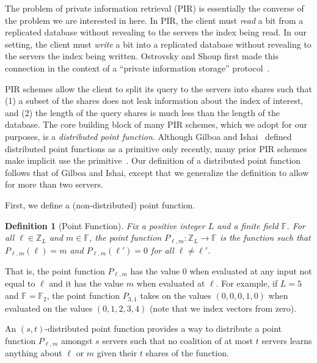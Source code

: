 \documentclass[10pt,twocolumn]{article}
\newtheorem{defn}{Definition}
\newcommand{\Z}{\mathbb{Z}}
\newcommand{\F}{\mathbb{F}}
\begin{document}
The problem of private information retrieval (PIR) is essentially the converse
of the problem we are interested in here.
In PIR, the client must {\em read} 
a bit from a replicated database without revealing to 
the servers the index being read.
In our setting, the client must {\em write}
a bit into a replicated database without revealing to the servers the
index being written.
Ostrovsky and Shoup first made this
connection in the context of a ``private information storage'' protocol~\cite{ostrovsky1997private}.

PIR schemes allow the client to split its query to the servers 
into shares such that  
(1) a subset of the shares does not leak information about the index of interest, and
(2) the length of the query shares is much less than the length of the database.
The core building block of many PIR schemes, which we adopt
for our purposes, is a {\em distributed point function}.
Although Gilboa and Ishai~\cite{gilboa2014distributed}
defined distributed point functions 
as a primitive only recently, many prior PIR schemes make implicit
use the primitive~\cite{chor1997computationally,chor1998private}.
Our definition of a distributed point function
follows that of Gilboa and Ishai, except
that we generalize the definition to allow 
for more than two servers.

First, we define a (non-distributed) point function.

\begin{defn}[Point Function]
Fix a positive integer $L$ and a finite field $\F$.
For all $\ell \in \Z_L$ and $m \in \F$, the {\em point function} $P_{\ell,m}: \Z_L \to \F$
is the function such that $P_{\ell,m}(\ell) = m$ and $P_{\ell,m}(\ell') = 0$ for
all $\ell \neq \ell'$.
\end{defn}

That is, the point function $P_{\ell,m}$ has the value $0$ when evaluated at any 
input not equal to $\ell$ and it has the value $m$ when evaluated at $\ell$.
For example, if $L = 5$ and $\F = \F_2$, the point function 
$P_{3,1}$ takes on the values $(0, 0, 0, 1, 0)$ when evaluated
on the values $(0, 1, 2, 3, 4)$ (note that we index vectors from zero).

An $(s,t)$-distributed point function provides a way to 
distribute a point function $P_{\ell,m}$ amongst $s$ servers such that
no coalition of at most $t$ servers learns anything about $\ell$ or $m$
given their $t$ shares of the function.
\end{document}
